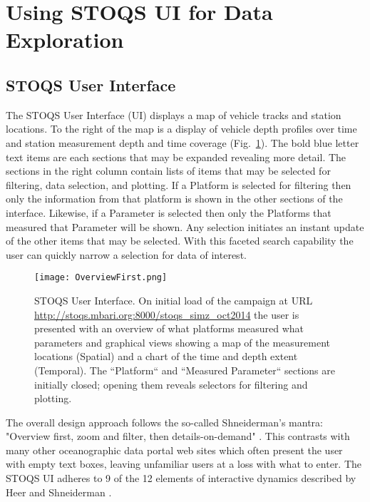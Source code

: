 \documentclass[conference]{IEEEtran}
\begin{document}
\section{Using STOQS UI for Data Exploration}

\subsection{STOQS User Interface}

The STOQS User Interface (UI) displays a map of vehicle tracks and station locations.
To the right of the map is a display of 
vehicle depth profiles over time and station measurement 
depth and time coverage (Fig.~\ref{fig:OverviewFirst}). 
The bold blue letter text 
items are each sections that may be expanded revealing more detail. 
The sections in the right column contain lists of items that may be 
selected for filtering, data selection, and plotting. If a Platform is selected for 
filtering then only the information from that platform is shown in the other sections 
of the interface. 
Likewise, if a Parameter is selected then only the Platforms that measured that
Parameter will be shown.
Any selection initiates an instant update of the other items that 
may be selected. With this faceted search capability the user can quickly narrow a 
selection for data of interest. 

\begin{figure}[htbp]
\centering
\texttt{[image: OverviewFirst.png]}
\caption{STOQS User Interface. On initial load of the campaign at URL 
\url{http://stoqs.mbari.org:8000/stoqs_simz_oct2014} the user is presented 
with an overview of what platforms measured what parameters and graphical views showing 
a  map of the measurement locations (Spatial) and a chart of the time and depth extent (Temporal).
The ``Platform`` and ``Measured Parameter`` sections are initially closed; opening them 
reveals selectors for filtering and plotting.}
\label{fig:OverviewFirst}
\end{figure}

The overall design approach follows the so-called Shneiderman's mantra: "Overview first, 
zoom and filter, then details-on-demand" \cite{Whitney:2012:DIN:2597850}. This contrasts 
with many other oceanographic data portal web sites which often present the user with empty text boxes, 
leaving unfamiliar users at a loss with what to enter. The STOQS UI adheres to 9 
of the 12 elements of interactive dynamics described by Heer and Shneiderman 
\cite{Heer:2012:IDV:2133416.2146416}.
\end{document}
